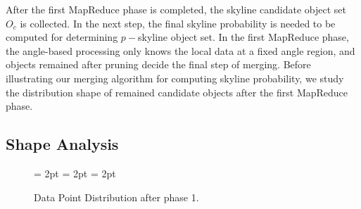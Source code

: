 After the first MapReduce phase is completed, the skyline candidate object set $O_c$ is collected. In the next step, the final skyline probability is needed to be computed for determining $p-$skyline object set. In the first MapReduce phase, the angle-based processing only knows the local data at a fixed angle region, and objects remained after pruning decide the final step of merging. Before illustrating our merging algorithm for computing skyline probability, we study the distribution shape of remained candidate objects after the first MapReduce phase.
\subsection{Shape Analysis}

\begin{figure}[!t]
    \begin{center}
    \vspace{-1.5pc}
  \subfigbottomskip = 2pt 
    \hspace{0.01em}
  \subfigbottomskip = 2pt  
    \hspace{0.01em}
  \subfigbottomskip = 2pt  

    \caption{Data Point Distribution after phase 1.}
    \label{fig:shape}
    \end{center}
\vspace{-10pt}
\end{figure}

